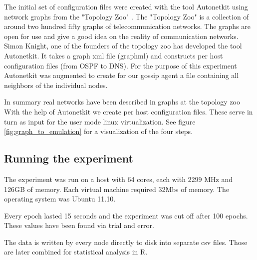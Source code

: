 The initial set of configuration files were created with the tool Autonetkit \cite{autonetkit} using network graphs from the "Topology Zoo" \cite{knight_internet_2011}. The "Topology Zoo" is a collection of around two hundred fifty graphs of telecommunication networks. The graphs are open for use and give a good idea on the reality of communication networks. Simon Knight, one of the founders of the topology zoo has developed the tool Autonetkit. It takes a graph xml file (graphml) and constructs per host configuration files (from OSPF to DNS). For the purpose of this experiment Autonetkit was augmented to create for our gossip agent a file containing all neighbors of the individual nodes.

In summary real networks have been described in graphs at the topology zoo With the help of Autonetkit we create per host configuration files. These serve in turn as input for the user mode linux virtualization. See figure \ref{fig:graph_to_emulation} for a visualization of the four steps.

\subsection{Running the experiment}
The experiment was run on a host with 64 cores, each with 2299 MHz and 126GB of memory. Each virtual machine required 32Mbs of memory. The operating system was Ubuntu 11.10.

Every epoch lasted 15 seconds and the experiment was cut off after 100 epochs. These values have been found via trial and error.

The data is written by every node directly to disk into separate csv files. Those are later combined for statistical analysis in R.
